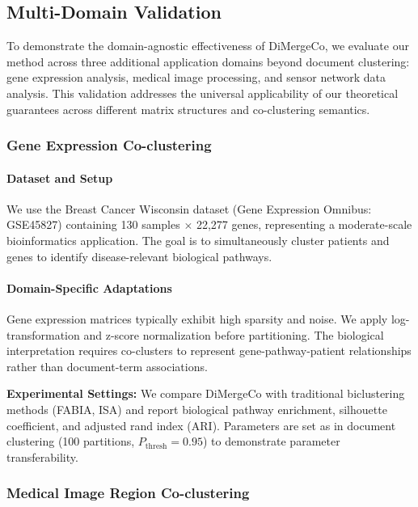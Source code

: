 \documentclass[journal]{IEEEtran}
\begin{document}
    {\color{blue}

        \subsection{Multi-Domain Validation}
        \label{subsec:multi_domain}

        To demonstrate the domain-agnostic effectiveness of DiMergeCo, we evaluate our method across three additional application domains beyond document clustering: gene expression analysis, medical image processing, and sensor network data analysis. This validation addresses the universal applicability of our theoretical guarantees across different matrix structures and co-clustering semantics.

        \subsubsection{Gene Expression Co-clustering}

        \paragraph{Dataset and Setup}
        We use the Breast Cancer Wisconsin dataset (Gene Expression Omnibus: GSE45827) containing 130 samples $\times$ 22,277 genes, representing a moderate-scale bioinformatics application. The goal is to simultaneously cluster patients and genes to identify disease-relevant biological pathways.

        \paragraph{Domain-Specific Adaptations}
        Gene expression matrices typically exhibit high sparsity and noise. We apply log-transformation and z-score normalization before partitioning. The biological interpretation requires co-clusters to represent gene-pathway-patient relationships rather than document-term associations.

        \textbf{Experimental Settings:} We compare DiMergeCo with traditional biclustering methods (FABIA, ISA) and report biological pathway enrichment, silhouette coefficient, and adjusted rand index (ARI). Parameters are set as in document clustering (100 partitions, $P_{\text{thresh}}=0.95$) to demonstrate parameter transferability.

        \subsubsection{Medical Image Region Co-clustering}

}
\end{document}

